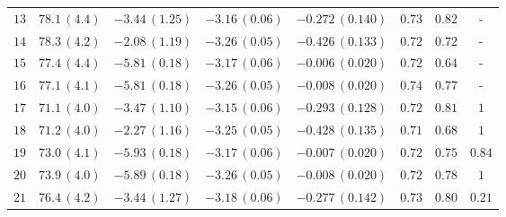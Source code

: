\begin{table}
{\begin{tabular}{cccccccc}

$13$ & $78.1\,(4.4)$& $-3.44\,(1.25)$ & $-3.16\,(0.06)$& $-0.272\,(0.140)$ & $ 0.73 $ & $ 0.82 $ & - \\

 
$14$ & $78.3\,(4.2)$& $-2.08\,(1.19)$ & $-3.26\,(0.05)$& $-0.426\,(0.133)$ & $ 0.72 $ & $ 0.72 $ & -\\

  
$15$ & $77.4\,(4.4)$& $-5.81\,(0.18)$& $-3.17\,(0.06)$& $-0.006\,(0.020)$ & $ 0.72 $ & $ 0.64 $ & - \\


$16$ & $77.1\,(4.1)$& $-5.81\,(0.18)$& $-3.26\,(0.05)$& $-0.008\,(0.020)$ & $ 0.74 $ & $ 0.77 $ & - \\
   


$17$ &$ 71.1\,(4.0)$ & $-3.47\,(1.10)$& $-3.15\,(0.06)$& $-0.293\,(0.128)$ & $ 0.72 $ & $ 0.81 $ & $1 $ \\

$18$ &$ 71.2\,(4.0)$ & $-2.27\,(1.16)$& $-3.25\,(0.05)$& $-0.428\,(0.135)$ & $ 0.71 $ & $ 0.68 $ & $ 1$ \\

$19$ &$73.0\,(4.1)$ & $-5.93\,(0.18)$& $-3.17\,(0.06)$& $-0.007\,(0.020)$ & $ 0.72 $ & $ 0.75 $ & $ 0.84 $ \\

$20$ &$73.9\,(4.0)$ & $-5.89\,(0.18)$& $-3.26\,(0.05)$& $-0.008\,(0.020)$ & $ 0.72 $ & $ 0.78$ & $1 $ \\


$21$ & $76.4\,(4.2)$&$-3.44\,(1.27)$ &$-3.18\,(0.06) $ &$-0.277\,(0.142) $ & $ 0.73 $ & $ 0.80 $ & $ 0.21 $\\
 

\end{tabular}}
\end{table}
